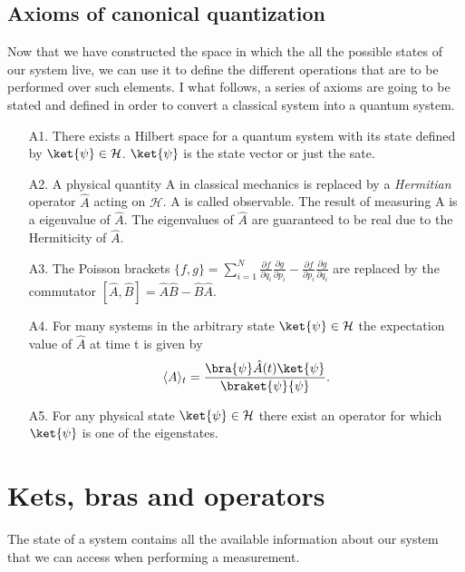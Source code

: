 \documentclass{article}
\begin{document}
\subsection{Axioms of canonical quantization}
Now that we have constructed the space in which the all the possible states of our system live, we can use it to define the different operations that are to be performed over such elements. I what follows, a series of axioms are going to be stated and defined in order to convert a classical system into a quantum system.

\begin{itemize}
  \item [A1.] There exists a Hilbert space for a quantum system with its state defined by $\ket{\psi} \in \mathcal{H}$. $\ket{\psi}$ is the state vector or just the sate.
  \item [A2.] A physical quantity A in classical mechanics is replaced by a \textit{Hermitian} operator $\hat{A}$ acting on $\mathcal{H}$. A is called observable. The result of measuring A is a eigenvalue of $\hat{A}$. The eigenvalues of $\hat{A}$ are guaranteed to be real due to the Hermiticity of $\hat{A}$.
  \item [A3.] The Poisson brackets $\{f,g\}=\sum_{i=1}^N\frac{\partial f}{\partial q_i}\frac{\partial g}{\partial p_i}-\frac{\partial f}{\partial p_i}\frac{\partial g}{\partial q_i}$ are replaced by the commutator $[\hat{A},\hat{B}]=\hat{A}\hat{B} - \hat{B}\hat{A}$.
  \item [A4.]{ For many systems in the arbitrary state $\ket{\psi} \in \mathcal{H}$ the expectation value of $\hat{A}$ at time t is given by
  \begin{align}
    \langle A \rangle_t =\frac{\bra{\psi}\hat{A}(t)\ket{\psi}}{\braket{\psi}{\psi}}.
  \end{align}
  }
  \item [A5.] For any physical state $\ket{\psi} \in \mathcal{H}$ there exist an operator for which $\ket{\psi}$ is one of the eigenstates.
\end{itemize}
\section{Kets, bras and operators}
The state of a system contains all the available information about our system that we can access when performing a measurement.
\end{document}
